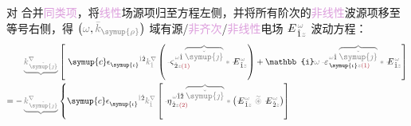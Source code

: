对  合并\textcolor{Plum}{同类项}，将\textcolor{Plum}{线性}场源项归至方程左侧，并将所有阶次的\textcolor{Plum}{非线性}\textcolor{NavyBlue}{波源}项移至等号右侧，得 $\left( \mathcolor{gray}{\omega}, \mathcolor{gray}{\bar{k}_{\symup{\rho}}} \right)$ 域\textcolor{NavyBlue}{有源}/\textcolor{Plum}{非齐次}/\textcolor{Plum}{非线性}电场 $\Xint{\mathcolor{gray}{-}}{295}{E}^{\;\!\mathcolor{gray}{\omega}}_{\;\! \hat{1} \mathcolor{gray}{z}}$ 波动方程：
\begin{subequations}
	\belowdisplayskip=3pt
\begin{align}
	&\mathcolor{gray}{\underbrace{k^\nabla_{\;\! \check{\symup{\jmath}}}}} \left[~ {\symup{c}} \epsilon^{\hphantom{\symup{\iota}}\mathcolor{gray}{\dot{1}}\dot{2}}_{\symup{\iota}} \mathcolor{gray}{k^\nabla_{\dot{1}}} \left( \Xint{\begin{smallmatrix} ~ \\ {}^{}_{\mathcolor{gray}{-}} \\ ~ \end{smallmatrix}}{13}{\varsigma}^{\;\! \mathcolor{gray}{\omega} \hat{1} \;\! \mathcolor{gray}{\overbrace{\check{\symup{\jmath}}}}}_{\;\! \dot{2} \mathcolor{gray}{z} \textcolor{Maroon}{(1)}} \mathcolor{gray}{*} \Xint{\mathcolor{gray}{-}}{295}{E}^{\;\!\mathcolor{gray}{\omega}}_{\;\! \hat{1} \mathcolor{gray}{z}} \right) + \mathbb{i} \mathcolor{gray}{\omega} \Xint{\begin{smallmatrix} ~ \\ {}^{}_{\mathcolor{gray}{-}} \\ ~ \end{smallmatrix}}{16}{\varepsilon}^{\;\! \mathcolor{gray}{\omega} \hat{1} \;\! \mathcolor{gray}{\overbrace{\check{\symup{\jmath}}}}}_{\;\! \symup{\iota} \mathcolor{gray}{z} \textcolor{Maroon}{(1)}} \mathcolor{gray}{*} \Xint{\mathcolor{gray}{-}}{295}{E}^{\;\!\mathcolor{gray}{\omega}}_{\;\! \hat{1} \mathcolor{gray}{z}} \right]  \label{eq:nonlinear-wave_wkrho} \\ = - &\mathcolor{gray}{\underbrace{k^\nabla_{\;\! \check{\symup{\jmath}}}}} \left\{ {\symup{c}} \epsilon^{\hphantom{\symup{\iota}}\mathcolor{gray}{\dot{1}}\dot{2}}_{\symup{\iota}} \mathcolor{gray}{k^\nabla_{\dot{1}}} \left[ \Xint{\begin{smallmatrix} ~ \\ {}^{}_{\mathcolor{gray}{-}} \\ ~ \end{smallmatrix}}{17}{\eta}^{\;\! \mathcolor{gray}{\omega} \hat{1} \hat{2} \;\! \mathcolor{gray}{\overbrace{\check{\symup{\jmath}}}}}_{\;\! \dot{2} \mathcolor{gray}{z} \textcolor{Maroon}{(2)}} \mathcolor{gray}{*} \left( \Xint{\mathcolor{gray}{-}}{295}{E}^{\;\!\mathcolor{gray}{\omega}}_{\;\! \hat{1} \mathcolor{gray}{z}} ~\mathcolor{gray}{\widetilde \circledast}~ \Xint{\mathcolor{gray}{-}}{295}{E}^{\;\!\mathcolor{gray}{\omega}}_{\;\! \hat{2} \mathcolor{gray}{z}} \right) \right] \right. \\ 

\end{align}
\end{subequations}
